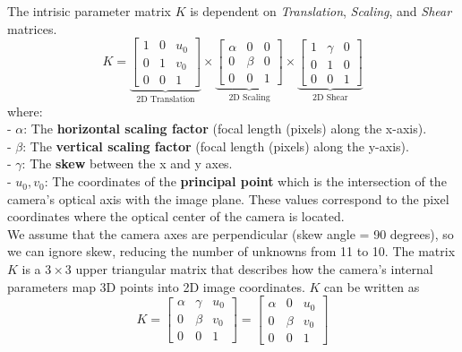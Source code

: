 \documentclass[12pt]{report}
\begin{document}
\begin{enumerate}
\begin{enumerate}
    The intrisic parameter matrix \( K \) is dependent on \textit{Translation}, \textit{Scaling}, and \textit{Shear} matrices.
    $$
    K = 
    \underbrace{\begin{bmatrix}
    1 & 0 & u_0 \\
    0 & 1 & v_0 \\
    0 & 0 & 1
    \end{bmatrix}}_{\text{2D Translation}} \times 
    \underbrace{\begin{bmatrix}
    \alpha & 0 & 0 \\
    0 & \beta & 0 \\
    0 & 0 & 1
    \end{bmatrix}}_{\text{2D Scaling}} \times 
    \underbrace{\begin{bmatrix}
    1 & \gamma & 0 \\
    0 & 1 & 0 \\
    0 & 0 & 1
    \end{bmatrix}}_{\text{2D Shear}}
    $$
    where:\\
    - \( \alpha \): The \textbf{horizontal scaling factor} (focal length (pixels) along the x-axis).\\
    - \( \beta \): The \textbf{vertical scaling factor} (focal length (pixels) along the y-axis).\\
    - \( \gamma \): The \textbf{skew} between the x and y axes.\\
    - \( u_0, v_0 \): The coordinates of the \textbf{principal point} which is the intersection of the camera's optical axis with the image plane. These values correspond 
    to the pixel coordinates where the optical center of the camera is located.\\

    We assume that the camera axes are perpendicular (skew angle = 90 degrees), so we can ignore skew, reducing the number of unknowns from 11 to 10. The matrix 
    \( K \) is a \( 3 \times 3 \) upper triangular matrix that describes how the camera's internal parameters map 3D points into 2D image coordinates. \( K \) can 
    be written as
    $$
    K = \begin{bmatrix}
    \alpha & \gamma & u_0 \\
    0      & \beta  & v_0 \\
    0      & 0      & 1
    \end{bmatrix} = 
    \begin{bmatrix}
    \alpha & 0      & u_0 \\
    0      & \beta  & v_0 \\
    0      & 0      & 1
    \end{bmatrix}
    $$



\end{enumerate}
\end{enumerate}
\end{document}
